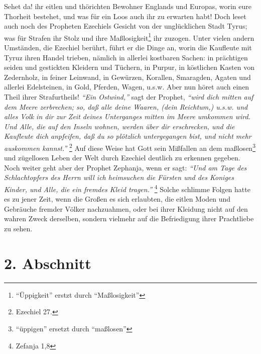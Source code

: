 Sehet da! ihr eitlen und thörichten Bewohner Englands und Europas, worin eure
Thorheit bestehet, und was für ein Loos auch ihr zu erwarten habt! Doch leset
auch noch des Propheten Ezechiels Gesicht von der unglücklichen Stadt Tyrus; was
für Strafen ihr Stolz und ihre Maßlosigkeit\footnote{"`Üppigkeit"' erstzt durch "`Maßlosigkeit"'} ihr zuzogen. Unter vielen andern
Umständen, die Ezechiel berührt, führt er die Dinge an, worin die Kaufleute mit
Tyruz ihren Handel trieben, nämlich in allerlei kostbaren Sachen: in prächtigen
seiden und gestickten Kleidern und Tüchern, in Purpur, in köstlichen Kasten von
Zedernholz, in feiner Leinwand, in Gewürzen, Korallen, Smaragden, Agaten und
allerlei Edelsteinen, in Gold, Pferden, Wagen, u.s.w. Aber nun höret auch einen
Theil ihrer Strafurtheils! \textit{"`Ein Ostwind,"'} sagt der Prophet,
\textit{"`wird dich mitten
auf dem Meere zerbrechen; so, daß alle deine Waaren, (dein Reichtum,) u.s.w.
und alles Volk in dir zur Zeit deines Unterganges mitten im Meere umkommen wird.
Und Alle, die auf den Inseln wohnen, werden über dir erschrecken, und die
Kaufleute dich anpfeifen, daß du so plötzlich untergegangen bist, und nicht mehr
auskommen kannst."'}
\footnote{Ezechiel 27.}
Auf diese Weise hat Gott sein Mißfallen
an dem maßlosen\footnote{"`üppigen"' ersetzt durch "`maßlosen"'} und zügellosen Leben der Welt durch Ezechiel deutlich zu erkennen
gegeben. Noch weiter geht aber der Prophet Zephanja, wenn er sagt:
\textit{"`Und am Tage
des Schlachtopfers des Herrn will ich heimsuchen die Fürsten und des Koniges
Kinder, und Alle, die ein fremdes Kleid tragen."'}
\footnote{Zefanja 1,8}
Solche
schlimme Folgen hatte es zu jener Zeit, wenn die Großen es sich erlaubten, die
eitlen Moden und Gebräuche fremder Völker nachzuahmen, oder bei ihrer Kleidung
nicht auf den wahren Zweck derselben, sondern vielmehr auf die Befriedigung
ihrer Prachtliebe zu sehen.

\section{2. Abschnitt} \label{kap15_ab2}

